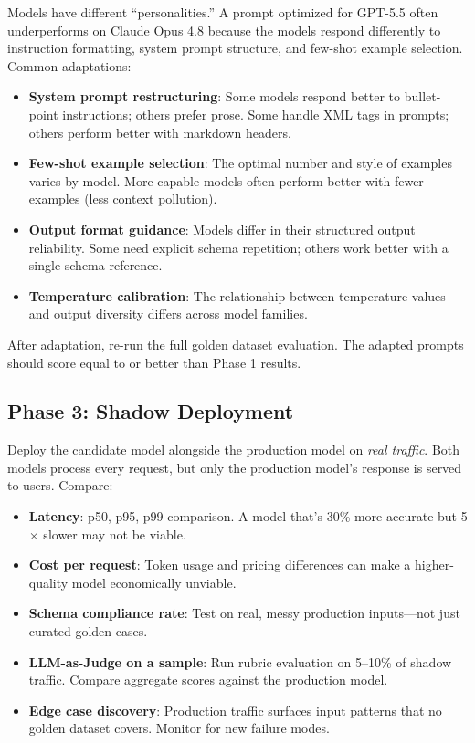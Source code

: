 Models have different ``personalities.'' A prompt optimized for GPT-5.5 often underperforms on Claude Opus 4.8 because the models respond differently to instruction formatting, system prompt structure, and few-shot example selection. Common adaptations:

\begin{itemize}[leftmargin=*]
    \item \textbf{System prompt restructuring}: Some models respond better to bullet-point instructions; others prefer prose. Some handle XML tags in prompts; others perform better with markdown headers.
    \item \textbf{Few-shot example selection}: The optimal number and style of examples varies by model. More capable models often perform better with fewer examples (less context pollution).
    \item \textbf{Output format guidance}: Models differ in their structured output reliability. Some need explicit schema repetition; others work better with a single schema reference.
    \item \textbf{Temperature calibration}: The relationship between temperature values and output diversity differs across model families.
\end{itemize}

After adaptation, re-run the full golden dataset evaluation. The adapted prompts should score equal to or better than Phase 1 results.

\subsection{Phase 3: Shadow Deployment}

Deploy the candidate model alongside the production model on \emph{real traffic}. Both models process every request, but only the production model's response is served to users. Compare:

\begin{itemize}[leftmargin=*]
    \item \textbf{Latency}: p50, p95, p99 comparison. A model that's 30\% more accurate but 5$\times$ slower may not be viable.
    \item \textbf{Cost per request}: Token usage and pricing differences can make a higher-quality model economically unviable.
    \item \textbf{Schema compliance rate}: Test on real, messy production inputs---not just curated golden cases.
    \item \textbf{LLM-as-Judge on a sample}: Run rubric evaluation on 5--10\% of shadow traffic. Compare aggregate scores against the production model.
    \item \textbf{Edge case discovery}: Production traffic surfaces input patterns that no golden dataset covers. Monitor for new failure modes.
\end{itemize}

